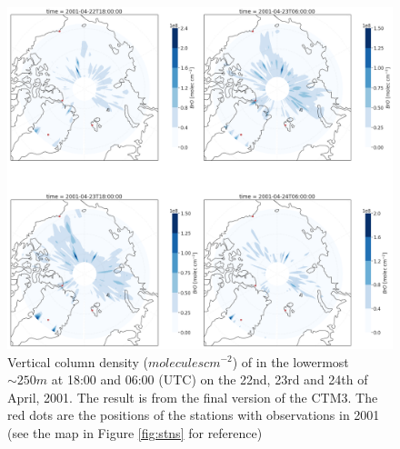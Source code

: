 \begin{figure}[h]
    \centering
    \includegraphics[width = \linewidth]{Chapter6_Results/images/polarBrO_step4.png}
    \caption{Vertical column density ($molecules cm^{-2}$) of  in the lowermost $\sim 250 m$ at 18:00 and 06:00 (UTC) on the 22nd, 23rd and 24th of April, 2001. The result is from the final version of the CTM3. The red dots are the positions of the stations with observations in 2001 (see the map in Figure \ref{fig:stns} for reference)}
    \label{fig:polarBrO_step4}
\end{figure}